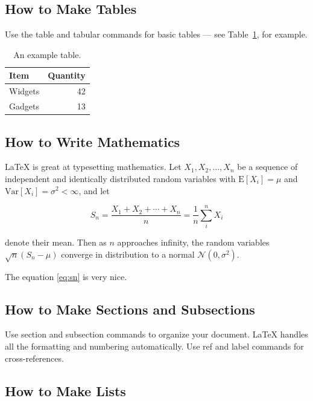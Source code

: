 \documentclass[a4paper]{article}
\begin{document}
\subsection{How to Make Tables}

Use the table and tabular commands for basic tables --- see Table~\ref{tab:widgets}, for example.

\begin{table}
\centering
\begin{tabular}{l|r}
Item & Quantity \\\hline
Widgets & 42 \\
Gadgets & 13
\end{tabular}
\caption{\label{tab:widgets}An example table.}
\end{table}

\subsection{How to Write Mathematics}

\LaTeX{} is great at typesetting mathematics. Let $X_1, X_2, \ldots, X_n$ be a sequence of independent and identically distributed random variables with $\text{E}[X_i] = \mu$ and $\text{Var}[X_i] = \sigma^2 < \infty$, and let

\begin{equation}
S_n = \frac{X_1 + X_2 + \cdots + X_n}{n}
      = \frac{1}{n}\sum_{i}^{n} X_i
\label{eq:sn}
\end{equation}

denote their mean. Then as $n$ approaches infinity, the random variables $\sqrt{n}(S_n - \mu)$ converge in distribution to a normal $\mathcal{N}(0, \sigma^2)$.

The equation \ref{eq:sn} is very nice.

\subsection{How to Make Sections and Subsections}

Use section and subsection commands to organize your document. \LaTeX{} handles all the formatting and numbering automatically. Use ref and label commands for cross-references.



\subsection{How to Make Lists}
\end{document}
